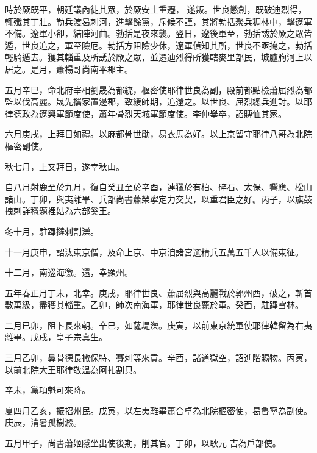 \begin{pinyinscope}
 時於厥既平，朝廷議內徙其眾，於厥安土重遷，
 遂叛。世良懲創，既破迪烈得，輒殲其丁壯。勒兵渡曷刺河，進擊餘黨，斥候不謹，其將勃括聚兵稠林中，擊遼軍不備。遼軍小卻，結陣河曲。勃括是夜來襲。翌日，遼後軍至，勃括誘於厥之眾皆遁，世良追之，軍至險厄。勃括方阻險少休，遼軍偵知其所，世良不亟掩之，勃括輕騎遁去。獲其輜重及所誘於厥之眾，並遷迪烈得所獲轄麥里部民，城臚朐河上以居之。是月，蕭楊哥尚南平郡主。



 五月辛巳，命北府宰相劉晟為都統，樞密使耶律世良為副，殿前都點檢蕭屈烈為都監以伐高麗。晟先攜家置邊郡，致緩師期，追還之。以世良、屈烈總兵進討。以耶
 律德政為遼興軍節度使，蕭年骨烈天城軍節度使。李仲舉卒，詔賻恤其家。



 六月庚戌，上拜日如禮。以麻都骨世勛，易衣馬為好。以上京留守耶律八哥為北院樞密副使。



 秋七月，上又拜日，遂幸秋山。



 自八月射鹿至於九月，復自癸丑至於辛酉，連獵於有柏、碎石、太保、響應、松山諸山。丁卯，與夷離畢、兵部尚書蕭榮寧定力交契，以重君臣之好。丙子，以旗鼓拽刺詳穩題裡姑為六部奚王。



 冬十月，駐蹕撻刺割濼。



 十一月庚申，詔汰東京僧，及命上京、中京洎諸宮選精兵五萬五千人以備東征。



 十二月，南巡海徼。還，幸顯州。



 五年春正月丁未，北幸。庚戌，耶律世良、蕭屈烈與高麗戰於郭州西，破之，斬首數萬級，盡獲其輜重。乙卯，師次南海軍，耶律世良薨於軍。癸酉，駐蹕雪林。



 二月已卯，阻卜長來朝。辛巳，如薩堤濼。庚寅，以前東京統軍使耶律韓留為右夷離畢。戊戌，皇子宗真生。



 三月乙卯，鼻骨德長撒保特、賽刺等來貢。辛酉，諸道獄空，詔進階賜物。丙寅，以前北院大王耶律敬溫為阿扎割只。



 辛未，黨項魁可來降。



 夏四月乙亥，振招州民。戊寅，以左夷離畢蕭合卓為北院樞密使，曷魯寧為副使。庚辰，清暑孤樹澱。



 五月甲子，尚書蕭姬隱坐出使後期，削其官。丁卯，以耿元
 吉為戶部使。




\end{pinyinscope}
